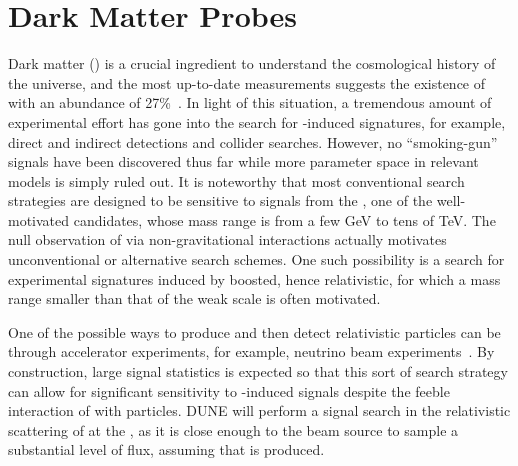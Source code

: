 


\section{Dark Matter Probes}\label{sec:DM}
Dark matter () is a crucial ingredient to understand the cosmological history of the universe, and the most up-to-date measurements suggests the existence of  with an abundance of 27\%~\cite{Aghanim:2018eyx}. 
In light of this situation, a tremendous amount of experimental effort has gone into %
the search for -induced signatures, for example,  direct and indirect detections and collider searches. However, no ``smoking-gun'' signals have been discovered thus far while more parameter space in relevant  models is simply ruled out. %
It is noteworthy that most conventional  search strategies are designed to be sensitive to signals from the , one of the well-motivated  candidates, whose mass range is from a few GeV to tens of TeV. 
The null observation of  via non-gravitational interactions actually motivates unconventional or alternative  search schemes. 
One such possibility is %
a search for experimental signatures induced by boosted, hence relativistic,  for which %
a mass range smaller than that of the weak scale is often motivated. 

One of the possible ways to produce and then detect relativistic  particles can be through accelerator experiments, 
for example, neutrino beam experiments~\cite{Alexander:2016aln, Battaglieri:2017aum, LoSecco:1980nf, Acciarri:2015uup}. 
By construction, large signal statistics is expected so that this sort of search strategy can allow for significant
sensitivity to -induced signals despite the feeble interaction of  with  particles. %
DUNE will perform a signal search in the relativistic scattering of  at the , as it is close enough to the beam source to sample a substantial level of  flux, assuming that  is produced.

